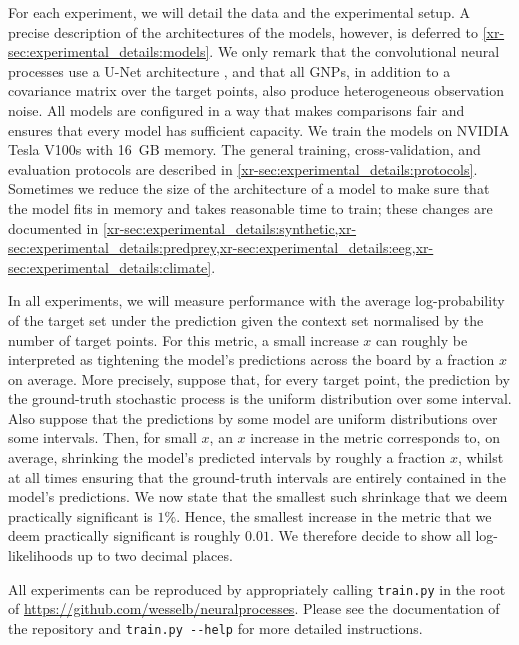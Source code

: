 \documentclass[12pt, twoside]{report}
\newcommand{\xrprefix}[1]{xr-#1}
\begin{document}
For each experiment, we will detail the data and the experimental setup.
A precise description of the architectures of the models, however, is deferred to \cref{\xrprefix{sec:experimental_details:models}}.
We only remark that the convolutional neural processes use a U-Net architecture \parencite{Ronneberger:2015:U-Net_Convolutional_Networks_for_Biomedical},
and that all GNPs,
in addition to a covariance matrix over the target points,
also produce heterogeneous observation noise.
All models are configured in a way that makes comparisons fair and ensures that every model has sufficient capacity.
We train the models on NVIDIA Tesla V100s with \SI{16}{GB} memory.
The general training, cross-validation, and evaluation protocols are described in \cref{\xrprefix{sec:experimental_details:protocols}}.
Sometimes we reduce the size of the architecture of a model %
to make sure that the model fits in memory and takes reasonable time to train;
these changes are documented in \cref{\xrprefix{sec:experimental_details:synthetic},\xrprefix{sec:experimental_details:predprey},\xrprefix{sec:experimental_details:eeg},\xrprefix{sec:experimental_details:climate}}.

In all experiments, we will measure performance with the average log-probability of the target set under the prediction given the context set normalised by the number of target points.
For this metric, a small increase $x$ can roughly be interpreted as tightening the model's predictions across the board by a fraction $x$ on average.
More precisely, suppose that, for every target point, the prediction by the ground-truth stochastic process is the uniform distribution over some interval.
Also suppose that the predictions by some model are uniform distributions over some intervals.
Then, for small $x$, an $x$ increase in the metric corresponds to, on average, shrinking the model's predicted intervals by roughly a fraction $x$, whilst at all times ensuring that the ground-truth intervals are entirely contained in the model's predictions.
We now state that the smallest such shrinkage that we deem practically significant is $1\%$.
Hence, the smallest increase in the metric that we deem practically significant is roughly $0.01$.
We therefore decide to show all log-likelihoods up to two decimal places.

All experiments can be reproduced by appropriately calling \texttt{train.py} in the root of \url{https://github.com/wesselb/neuralprocesses}.
Please see the documentation of the repository and \texttt{train.py -{}-help} for more detailed instructions.
\end{document}

